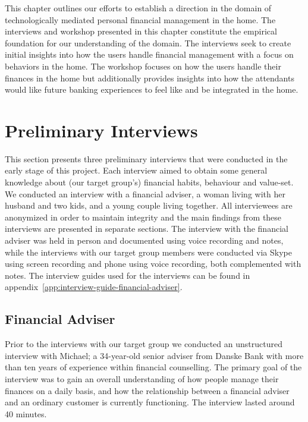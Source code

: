 This chapter outlines our efforts to establish a direction in the domain of technologically mediated personal financial management in the home. The interviews and workshop presented in this chapter constitute the empirical foundation for our understanding of the domain. The interviews seek to create initial insights into how the users handle financial management with a focus on behaviors in the home. The workshop focuses on how the users handle their finances in the home but additionally provides insights into how the attendants would like future banking experiences to feel like and be integrated in the home.

\section{Preliminary Interviews}
This section presents three preliminary interviews that were conducted in the early stage of this project. Each interview aimed to obtain some general knowledge about (our target group’s) financial habits, behaviour and value-set. We conducted an interview with a financial adviser, a woman living with her husband and two kids, and a young couple living together. All interviewees are anonymized in order to maintain integrity and the main findings from these interviews are presented in separate sections. The interview with the financial adviser was held in person and documented using voice recording and notes, while the interviews with our target group members were conducted via Skype using screen recording and phone using voice recording, both complemented with notes. The interview guides used for the interviews can be found in appendix~\ref{app:interview-guide-financial-adviser}.

\subsection{Financial Adviser}
Prior to the interviews with our target group we conducted an unstructured interview \cite[chapter~7]{sharp2007interaction} with Michael; a 34-year-old senior adviser from Danske Bank with more than ten years of experience within financial counselling. The primary goal of the interview was to gain an overall understanding of how people manage their finances on a daily basis, and how the relationship between a financial adviser and an ordinary customer is currently functioning. The interview lasted around 40 minutes.\\

